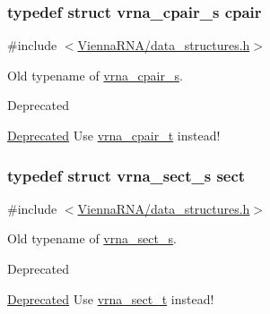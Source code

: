 \subsubsection[{\texorpdfstring{cpair}{cpair}}]{\setlength{\rightskip}{0pt plus 5cm}typedef struct {\bf vrna\+\_\+cpair\+\_\+s} {\bf cpair}}\hypertarget{group__data__structures_ga8412f116a2eb07b59ade9e14ca7c5ef1}{}\label{group__data__structures_ga8412f116a2eb07b59ade9e14ca7c5ef1}


{\ttfamily \#include $<$\hyperlink{data__structures_8h}{Vienna\+R\+N\+A/data\+\_\+structures.\+h}$>$}



Old typename of \hyperlink{group__data__structures_structvrna__cpair__s}{vrna\+\_\+cpair\+\_\+s}. 

\begin{DoxyRefDesc}{Deprecated}
\item[\hyperlink{deprecated__deprecated000048}{Deprecated}]Use \hyperlink{group__data__structures_gae4fc91141cc69c6d8eaf1332cb991ecc}{vrna\+\_\+cpair\+\_\+t} instead! \end{DoxyRefDesc}
\subsubsection[{\texorpdfstring{sect}{sect}}]{\setlength{\rightskip}{0pt plus 5cm}typedef struct {\bf vrna\+\_\+sect\+\_\+s} {\bf sect}}\hypertarget{group__data__structures_gaaacedee1f05d3d45aa6764eca51a8876}{}\label{group__data__structures_gaaacedee1f05d3d45aa6764eca51a8876}


{\ttfamily \#include $<$\hyperlink{data__structures_8h}{Vienna\+R\+N\+A/data\+\_\+structures.\+h}$>$}



Old typename of \hyperlink{group__data__structures_structvrna__sect__s}{vrna\+\_\+sect\+\_\+s}. 

\begin{DoxyRefDesc}{Deprecated}
\item[\hyperlink{deprecated__deprecated000049}{Deprecated}]Use \hyperlink{group__data__structures_gacc9cdae790dac75a7024e7069c0d4400}{vrna\+\_\+sect\+\_\+t} instead! \end{DoxyRefDesc}
